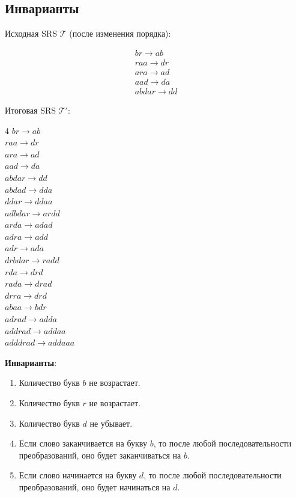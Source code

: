 \documentclass[a4paper, 12pt]{article}
\newcommand{\T}{\mathcal{T}}
\begin{document}
    \subsection{Инварианты}

    Исходная SRS $\T$ (после изменения порядка):

    \begin{gather*}
    br    \to ab\\
    raa   \to dr\\
    ara   \to ad\\
    aad   \to da\\
    abdar \to dd
    \end{gather*}

    Итоговая SRS $\T'$:

    \begin{flushleft}
    \begin{multicols}{4}
    $br      \to ab$\\
    $raa     \to dr$\\
    $ara     \to ad$\\
    $aad     \to da$\\
    $abdar   \to dd$\\
    $abdad   \to dda$\\
    $ddar    \to ddaa$\\
    $adbdar  \to ardd$\\
    $arda    \to adad$\\
    $adra    \to add$\\
    $adr     \to ada$\\
    $drbdar  \to radd$\\
    $rda     \to drd$\\
    $rada    \to drad$\\
    $drra    \to drd$\\
    $abaa    \to bdr$\\
    $adrad   \to adda$\\
    $addrad  \to addaa$\\
    $adddrad \to addaaa$\\
    \end{multicols}
    \end{flushleft}


    \textbf{Инварианты}:
    \begin{enumerate}
        \itemsep -0.8pt 
        \item Количество букв $b$ не возрастает.
        \item Количество букв $r$ не возрастает.
        \item Количество букв $d$ не убывает.
        \item Если слово заканчивается на букву $b$, то после любой последовательности преобразований, оно будет заканчиваться на $b$.
        \item Если слово начинается на букву $d$, то после любой последовательности преобразований, оно будет начинаться на $d$.
    \end{enumerate}
    
\end{document}
